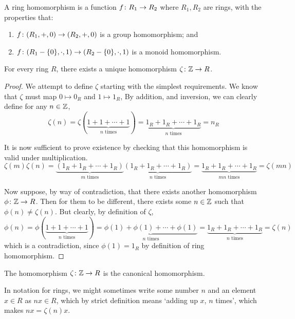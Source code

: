 \begin{definition}
    A ring homomorphism is a function \(f\colon R_1\to R_2\)
    where \(R_1,R_2\) are rings,
    with the properties that:
    \begin{enumerate}[label={(\roman*)}, itemsep=0mm]
        \item \(f\colon(R_1,+,0)\to(R_2,+,0)\) is a group homomorphism; and
        \item \(f\colon(R_1 - \{0\},\cdot,1)\to(R_2 - \{0\},\cdot,1)\)
            is a monoid homomorphism.
    \end{enumerate}
\end{definition}
\begin{proposition}
    For every ring \(R\),
    there exists a unique homomorphism \(\zeta\colon\mathbb{Z}\to R\).
\end{proposition}
\begin{proof}
    We attempt to define \(\zeta\) starting with the simplest requirements.
    We know that \(\zeta\) must map \(0 \mapsto 0_R\) and \(1 \mapsto 1_R\),
    By addition, and inversion,
    we can clearly define for any \(n \in \mathbb{Z}\),
    \begin{equation*}
        \zeta(n) = \zeta(\underbrace{1+1+\cdots+1}_\textrm{\(n\) times})
    = \underbrace{1_R + 1_R + \cdots + 1_R}_\textrm{\(n\) times} = n_R
    \end{equation*}

    It is now sufficient to prove existence
    by checking that this homomorphism is valid under multiplication.
    \begin{equation*}
        \zeta(m)\zeta(n)
        = \underbrace{(1_R + 1_R + \cdots + 1_R)}_\textrm{\(m\) times}
        \underbrace{(1_R + 1_R + \cdots + 1_R)}_\textrm{\(n\) times}
        = \underbrace{1_R + 1_R + \cdots + 1_R}_\textrm{\(mn\) times}
        = \zeta(mn)
    \end{equation*}

    Now suppose, by way of contradiction,
    that there exists another homomorphism \(\phi\colon\mathbb{Z}\to R\).
    Then for them to be different,
    there exists some \(n \in \mathbb{Z}\) such that \(\phi(n) \neq \zeta(n)\).
    But clearly, by definition of \(\zeta\),
    \begin{equation*}
        \phi(n) = \phi(\underbrace{1+1+\cdots+1}_\textrm{\(n\) times})
        = \underbrace{\phi(1)+\phi(1)+\cdots+\phi(1)}_\textrm{\(n\) times}
        = \underbrace{1_R + 1_R + \cdots + 1_R}_\textrm{\(n\) times}
        = \zeta(n)
    \end{equation*}
    which is a contradiction,
    since \(\phi(1) = 1_R\) by definition of ring homomorphism.
\end{proof}
\begin{definition}
    The homomorphism \(\zeta\colon\mathbb{Z}\to R\)
    is the canonical homomorphism.
\end{definition}
\begin{remark}
    In notation for rings,
    we might sometimes write some number \(n\)
    and an element \(x \in R\) as \(nx \in R\),
    which by strict definition means `adding up \(x\), \(n\) times',
    which makes \(nx = \zeta(n)x\).
\end{remark}

